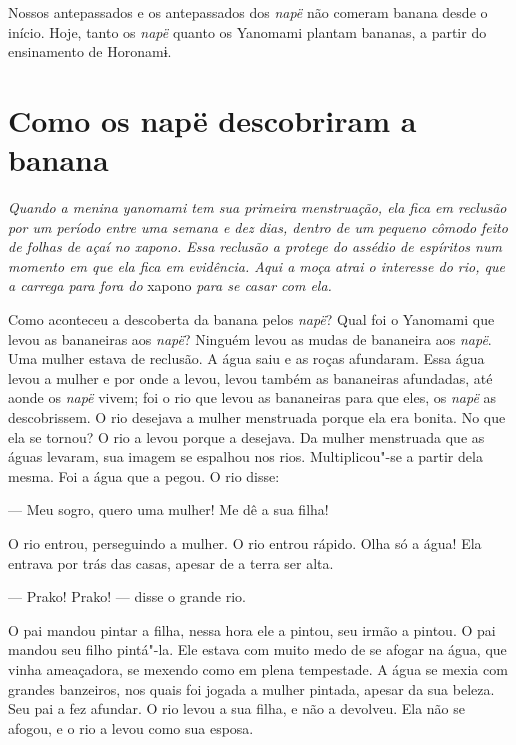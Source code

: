 Nossos antepassados e os antepassados dos \emph{napë} não comeram banana
desde o início. Hoje, tanto os \emph{napë} quanto os Yanomami plantam
bananas, a partir do ensinamento de Horonamɨ.

 

\section{Como os napë descobriram a banana}

 

\emph{Quando a menina yanomami tem sua primeira menstruação, ela fica em
reclusão por um período entre uma semana e dez dias, dentro de um
pequeno cômodo feito de folhas de açaí no xapono. Essa reclusão a
protege do assédio de espíritos num momento em que ela fica em
evidência. Aqui a moça atrai o interesse do rio, que a carrega para fora
do} xapono\emph{ para se casar com ela.}

 \asterisc{}

Como aconteceu a descoberta da banana pelos \emph{napë}? Qual foi o
Yanomami que levou as bananeiras aos \emph{napë}? Ninguém levou as mudas
de bananeira aos \emph{napë}. Uma mulher estava de reclusão. A água saiu
e as roças afundaram. Essa água levou a mulher e por onde a levou, levou
também as bananeiras afundadas, até aonde os \emph{napë} vivem; foi o
rio que levou as bananeiras para que eles, os \emph{napë} as
descobrissem. O rio desejava a mulher menstruada porque ela era bonita.
No que ela se tornou? O rio a levou porque a desejava. Da mulher
menstruada que as águas levaram, sua imagem se espalhou nos rios.
Multiplicou"-se a partir dela mesma. Foi a água que a pegou. O rio
disse: 

--- Meu sogro, quero uma mulher! Me dê a sua filha! 

O rio entrou, perseguindo a mulher. O rio entrou rápido. Olha só a água!
Ela entrava por trás das casas, apesar de a terra ser alta. 

--- Prako! Prako! --- disse o grande rio. 

O pai mandou pintar a filha, nessa hora ele a pintou, seu irmão a
pintou. O pai mandou seu filho pintá"-la. Ele estava com muito medo de se
afogar na água, que vinha ameaçadora, se mexendo como em plena
tempestade. A água se mexia com grandes banzeiros, nos quais foi
jogada a mulher pintada, apesar da sua beleza. Seu pai a fez afundar. O rio levou a sua filha, e não a devolveu. Ela não se afogou, e o rio a
levou como sua esposa. 

